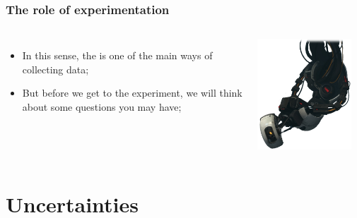 \documentclass{beamer}
\begin{document}
\begin{frame}
  \frametitle{The role of experimentation}
  \begin{columns}[c]
    \begin{itemize}
    \item In this sense, the  is one of the main
      ways of collecting data;
    \item But before we get to the experiment, we will think about
      some questions you may have;
    \end{itemize}
    \includegraphics[width=0.9\textwidth]{img/glados.png}
  \end{columns}
\end{frame}

\section{Uncertainties}
\end{document}
